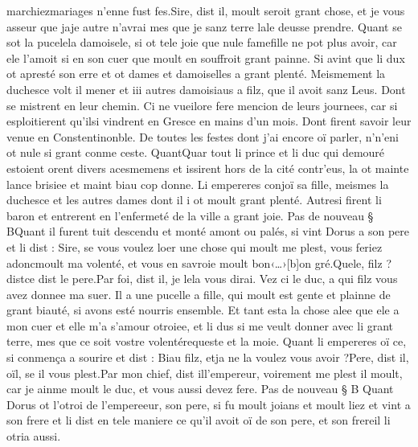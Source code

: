 \documentclass{article}
\begin{document}
\begin{pages}
                  marchiezmariages 
                     n’enne fust fes.Sire, dist il, moult seroit grant chose, 
                  et je vous asseur que jaje autre n’avrai mes que je sanz terre 
                  lale deusse prendre. \pend
\pstart Quant se sot 
   la pucelela damoisele, 
   si ot tele joie que nule famefille 
   ne pot plus avoir,
   car ele l’amoit si en son cuer que moult en souffroit grant painne. Si avint que li dux ot 
   apresté son erre et ot dames et damoiselles a grant plenté. 
   Meismement la duchesce 
   volt il mener et iii autres damoisiaus a filz, que il avoit sanz Leus. 
   Dont se mistrent en leur chemin. Ci ne vueilore 
      fere mencion de leurs journees, 
   car si esploitierent qu’ilsi vindrent en 
   Gresce en mains d’un mois. 
   Dont firent savoir leur venue en Constentinonble. De toutes les festes 
   dont j’ai encore oï parler, 
   n’n'eni ot nule si grant conme ceste. 
   QuantQuar tout li prince et li duc qui demouré estoient 
   orent divers acesmemens et issirent hors de 
   la cité contr’eus, la ot mainte lance brisiee et maint biau cop donne. 
   Li empereres conjoï sa fille, 
   meismes la duchesce et les autres dames dont il i ot moult grant plenté. 
   Autresi firent li baron et entrerent en l'enfermeté de la ville a grant joie. \pend
            \pstart Pas de nouveau § BQuant il furent tuit descendu et monté amont ou palés, si vint Dorus 
   a son pere et li dist :
   Sire, se vous voulez loer une chose qui moult me plest, 
      vous feriez 
      adoncmoult 
      ma volenté, et vous en savroie moult 
         bon‹…›[b]on gré.Quele, filz ? 
      distce dist 
      le pere.Par foi, dist il, je lela vous dirai. 
      Vez ci le duc, a qui filz 
   vous avez donnee ma suer. 
      Il a une pucelle a fille, qui moult est gente 
      et plainne de grant biauté, 
      si avons esté nourris ensemble. Et tant esta la chose alee que ele a 
      mon cuer et elle m’a s’amour otroiee, et li dus si me veult donner avec li grant terre, 
      mes que ce soit vostre volentérequeste et la moie.
   Quant li empereres oï ce, si conmença a sourire et dist :
   Biau filz, 
      etja ne la voulez vous avoir ?Pere, dist il, oïl, se il vous plest.Par mon chief, dist ill'empereur, 
      voirement me plest il moult, car je ainme moult le duc, et vous aussi devez fere. \pend
\pstart Pas de nouveau § B
   Quant Dorus ot l’otroi de 
   l’empereeur, son pere, 
   si fu moult joians et moult liez et vint a 
   son frere et li dist en tele maniere 
   ce qu’il avoit 
      oï de son pere, 
   et son frereil li otria aussi. 

\end{pages}
\end{document}
